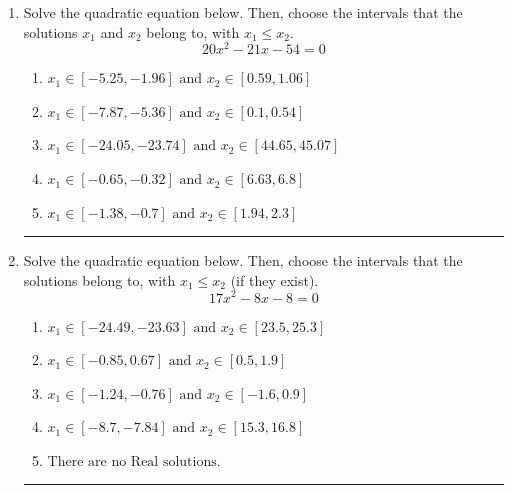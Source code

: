 \documentclass[14pt]{extbook}
\newcommand{\litem}[1]{\item#1\hspace*{-1cm}\rule{\textwidth}{0.4pt}}
\begin{document}
\begin{enumerate}
\litem{
Solve the quadratic equation below. Then, choose the intervals that the solutions $x_1$ and $x_2$ belong to, with $x_1 \leq x_2$.\[ 20x^{2} -21 x -54 = 0 \]\begin{enumerate}[label=\Alph*.]
\item \( x_1 \in [-5.25, -1.96] \text{ and } x_2 \in [0.59, 1.06] \)
\item \( x_1 \in [-7.87, -5.36] \text{ and } x_2 \in [0.1, 0.54] \)
\item \( x_1 \in [-24.05, -23.74] \text{ and } x_2 \in [44.65, 45.07] \)
\item \( x_1 \in [-0.65, -0.32] \text{ and } x_2 \in [6.63, 6.8] \)
\item \( x_1 \in [-1.38, -0.7] \text{ and } x_2 \in [1.94, 2.3] \)

\end{enumerate} }
\litem{
Solve the quadratic equation below. Then, choose the intervals that the solutions belong to, with $x_1 \leq x_2$ (if they exist).\[ 17x^{2} -8 x -8 = 0 \]\begin{enumerate}[label=\Alph*.]
\item \( x_1 \in [-24.49, -23.63] \text{ and } x_2 \in [23.5, 25.3] \)
\item \( x_1 \in [-0.85, 0.67] \text{ and } x_2 \in [0.5, 1.9] \)
\item \( x_1 \in [-1.24, -0.76] \text{ and } x_2 \in [-1.6, 0.9] \)
\item \( x_1 \in [-8.7, -7.84] \text{ and } x_2 \in [15.3, 16.8] \)
\item \( \text{There are no Real solutions.} \)


\end{enumerate}}
\end{enumerate}
\end{document}
